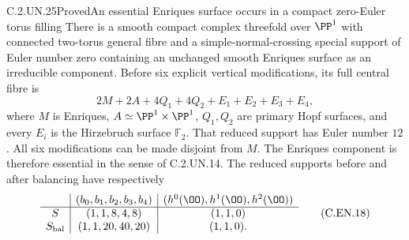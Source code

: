\begin{statement}{C.2.UN.25}{Proved}{An essential Enriques surface occurs in a compact zero-Euler torus filling}
There is a smooth compact complex threefold over
$\PP^1$ with connected two-torus general fibre and
a simple-normal-crossing special support of Euler
number zero containing an unchanged smooth Enriques
surface as an irreducible component.
Before six explicit vertical modifications, its full
central fibre is
\[
 2M+2A+4Q_1+4Q_2+E_1+E_2+E_3+E_4,                 \tag{C.EN.1}
\]
where $M$ is Enriques, $A\simeq\PP^1\times\PP^1$,
$Q_1,Q_2$ are primary Hopf surfaces, and every
$E_i$ is the Hirzebruch surface $\mathbb F_2$.
That reduced support has Euler number $12$.
All six modifications can be made disjoint from $M$.
The Enriques component is therefore essential in the
sense of C.2.UN.14.
The reduced supports before and after balancing have
respectively
\[
 \begin{array}{c|c|c}
 & (b_0,b_1,b_2,b_3,b_4)&(h^0(\OO),h^1(\OO),h^2(\OO))\\ \hline
 S&(1,1,8,4,8)&(1,1,0)\\
 S_{\rm bal}&(1,1,20,40,20)&(1,1,0).
 \end{array}                                             \tag{C.EN.18}
\]
\end{statement}
